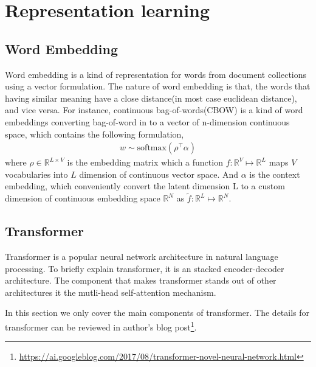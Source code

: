 \section{Representation learning}
\subsection{Word Embedding} \label{ch2:we}
Word embedding\cite{bengio_neural_nodate} is a kind of representation for words from document collections using a vector formulation. The nature of word embedding is that, the words that having similar meaning have a close distance(in most case euclidean distance), and vice versa. For instance, continuous bag-of-words(CBOW) \cite{mikolov_distributed_nodate} is a kind of word embeddings converting bag-of-word in to a vector of n-dimension continuous space, which contains the following formulation,
\begin{align*}
w\sim\text{softmax}(\rho^\top\alpha)
\end{align*}
where $ \rho\in\mathbb{R}^{L\times V} $ is the embedding matrix which a function $ f:\mathbb{R}^V\mapsto\mathbb{R}^{L} $ maps $ V $ vocabularies into $ L $ dimension of continuous vector space. And $ \alpha $ is the context embedding, which conveniently convert the latent dimension L to a custom dimension of continuous embedding space $ \mathbb{R}^{N} $ as $ \tilde{f}:\mathbb{R}^L\mapsto\mathbb{R}^{N} $.
\subsection{Transformer} \label{ch2:transformer}
Transformer\cite{vaswani_attention_nodate} is a popular neural network architecture in natural language processing. To briefly explain transformer, it is an stacked encoder-decoder architecture. The component that makes transformer stands out of other architectures it the mutli-head self-attention mechanism. 

In this section we only cover the main components of transformer. The details for transformer can be reviewed in author's blog post\footnote{\url{https://ai.googleblog.com/2017/08/transformer-novel-neural-network.html}}.

